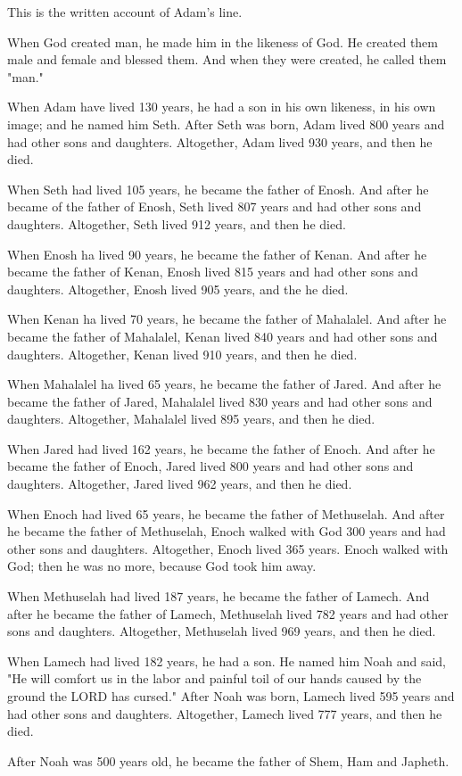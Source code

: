 \C This is the written account of Adam's line.

When God created man, he made him in the likeness of God. \V He created them
male and female and blessed them. And when they were created, he called them
"man."

\V When Adam have lived 130 years, he had a son in his own likeness, in his own
image; and he named him Seth. \V After Seth was born, Adam lived 800 years and
had other sons and daughters. \V Altogether, Adam lived 930 years, and then he
died.

\V When Seth had lived 105 years, he became the father of Enosh. \V And after he
became of the father of Enosh, Seth lived 807 years and had other sons and
daughters. \V Altogether, Seth lived 912 years, and then he died.

\V When Enosh ha lived 90 years, he became the father of Kenan. \V And after he
became the father of Kenan, Enosh lived 815 years and had other sons and
daughters. \V Altogether, Enosh lived 905 years, and the he died.

\V When Kenan ha lived 70 years, he became the father of Mahalalel. \V And after
he became the father of Mahalalel, Kenan lived 840 years and had other sons and
daughters. \V Altogether, Kenan lived 910 years, and then he died.

\V When Mahalalel ha lived 65 years, he became the father of Jared. \V And after
he became the father of Jared, Mahalalel lived 830 years and had other sons and
daughters. \V Altogether, Mahalalel lived 895 years, and then he died.

\V When Jared had lived 162 years, he became the father of Enoch. \V And after
he became the father of Enoch, Jared lived 800 years and had other sons and
daughters. \V Altogether, Jared lived 962 years, and then he died.

\V When Enoch had lived 65 years, he became the father of Methuselah. \V And
after he became the father of Methuselah, Enoch walked with God 300 years and
had other sons and daughters. \V Altogether, Enoch lived 365 years. \V Enoch
walked with God; then he was no more, because God took him away.

\V When Methuselah had lived 187 years, he became the father of Lamech. \V And
after he became the father of Lamech, Methuselah lived 782 years and had other
sons and daughters. \V Altogether, Methuselah lived 969 years, and then he died.

\V When Lamech had lived 182 years, he had a son. \V He named him Noah and said,
"He will comfort us in the labor and painful toil of our hands caused by the
ground the LORD has cursed." \V After Noah was born, Lamech lived 595 years and
had other sons and daughters. \V Altogether, Lamech lived 777 years, and then he
died.

\V After Noah was 500 years old, he became the father of Shem, Ham and Japheth.
